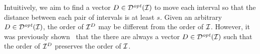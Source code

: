 Intuitively, we aim to find a vector $D \in \mathcal{D}^{\mathit{opt}}(\mathcal{I})$ to move each interval so that the distance between each pair of intervals is at least $s$.
Given an arbitrary $D \in \mathcal{D}^{\mathit{opt}}(\mathcal{I})$, the order of $\mathcal{I}^D$ may be different from the order of $\mathcal{I}$.
However, it was previously shown~\cite{HonoratoDroguett2024} that the there are always a vector $D \in \mathcal{D}^{\mathit{opt}}(\mathcal{I})$ such that the order of $\mathcal{I}^D$ preserves the order of $\mathcal{I}$.
%
%
%
